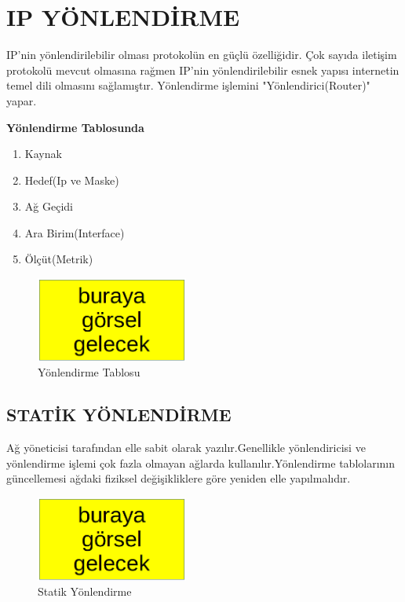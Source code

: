 \section{IP YÖNLENDİRME}

IP'nin yönlendirilebilir olması protokolün  en güçlü özelliğidir. Çok sayıda iletişim protokolü mevcut olmasına rağmen IP'nin yönlendirilebilir esnek yapısı internetin temel dili olmasını sağlamıştır. Yönlendirme işlemini "Yönlendirici(Router)" yapar.

\textbf{Yönlendirme Tablosunda}
\begin{enumerate}[label=\alph*)] 
   \item Kaynak
   \item Hedef(Ip ve Maske)
   \item Ağ Geçidi
   \item Ara Birim(Interface)
   \item Ölçüt(Metrik)
\end{enumerate}

\begin{figure}[ht]
    \centering
    \includegraphics[width=5cm]{images/BurayaGorselGelecek.png}
    \caption{Yönlendirme Tablosu}
    \label{fig:YonlendirmeTablosu}
\end{figure}

\subsection{STATİK YÖNLENDİRME}
Ağ yöneticisi tarafından elle sabit olarak yazılır.Genellikle yönlendiricisi ve yönlendirme işlemi çok fazla olmayan ağlarda kullanılır.Yönlendirme tablolarının güncellemesi ağdaki fiziksel değişikliklere göre yeniden elle yapılmalıdır.

\begin{figure}[ht]
    \centering
    \includegraphics[width=5cm]{images/BurayaGorselGelecek.png}
    \caption{Statik Yönlendirme}
    \label{fig:StatikYonlendirme}
\end{figure}

